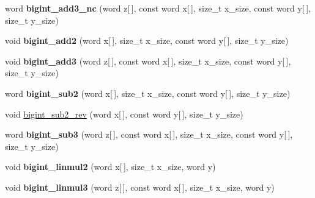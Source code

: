 \begin{DoxyCompactItemize}
\item 
\hypertarget{namespaceBotan_ac6b0c61acfab2f864b2cf3999ca76c01}{word {\bfseries bigint\-\_\-add3\-\_\-nc} (word z\mbox{[}$\,$\mbox{]}, const word x\mbox{[}$\,$\mbox{]}, size\-\_\-t x\-\_\-size, const word y\mbox{[}$\,$\mbox{]}, size\-\_\-t y\-\_\-size)}\label{namespaceBotan_ac6b0c61acfab2f864b2cf3999ca76c01}

\item 
\hypertarget{namespaceBotan_a909ae118a4227e2c3b1d6dac8cde629c}{void {\bfseries bigint\-\_\-add2} (word x\mbox{[}$\,$\mbox{]}, size\-\_\-t x\-\_\-size, const word y\mbox{[}$\,$\mbox{]}, size\-\_\-t y\-\_\-size)}\label{namespaceBotan_a909ae118a4227e2c3b1d6dac8cde629c}

\item 
\hypertarget{namespaceBotan_a2b90c82b13db8553eaa2701a8dd5975f}{void {\bfseries bigint\-\_\-add3} (word z\mbox{[}$\,$\mbox{]}, const word x\mbox{[}$\,$\mbox{]}, size\-\_\-t x\-\_\-size, const word y\mbox{[}$\,$\mbox{]}, size\-\_\-t y\-\_\-size)}\label{namespaceBotan_a2b90c82b13db8553eaa2701a8dd5975f}

\item 
\hypertarget{namespaceBotan_a1d2b962eb5d832116befc5957a6c975e}{word {\bfseries bigint\-\_\-sub2} (word x\mbox{[}$\,$\mbox{]}, size\-\_\-t x\-\_\-size, const word y\mbox{[}$\,$\mbox{]}, size\-\_\-t y\-\_\-size)}\label{namespaceBotan_a1d2b962eb5d832116befc5957a6c975e}

\item 
void \hyperlink{namespaceBotan_a108c3a5b46712583de64a39d5fa6841b}{bigint\-\_\-sub2\-\_\-rev} (word x\mbox{[}$\,$\mbox{]}, const word y\mbox{[}$\,$\mbox{]}, size\-\_\-t y\-\_\-size)
\item 
\hypertarget{namespaceBotan_aecdda04dbd8f4ec5aab85af9983e9c7a}{word {\bfseries bigint\-\_\-sub3} (word z\mbox{[}$\,$\mbox{]}, const word x\mbox{[}$\,$\mbox{]}, size\-\_\-t x\-\_\-size, const word y\mbox{[}$\,$\mbox{]}, size\-\_\-t y\-\_\-size)}\label{namespaceBotan_aecdda04dbd8f4ec5aab85af9983e9c7a}

\item 
\hypertarget{namespaceBotan_adaae60574552cb9732a25e7dc343b31d}{void {\bfseries bigint\-\_\-linmul2} (word x\mbox{[}$\,$\mbox{]}, size\-\_\-t x\-\_\-size, word y)}\label{namespaceBotan_adaae60574552cb9732a25e7dc343b31d}

\item 
\hypertarget{namespaceBotan_a13a0dbb64f0550a99fa972cb7400be41}{void {\bfseries bigint\-\_\-linmul3} (word z\mbox{[}$\,$\mbox{]}, const word x\mbox{[}$\,$\mbox{]}, size\-\_\-t x\-\_\-size, word y)}\label{namespaceBotan_a13a0dbb64f0550a99fa972cb7400be41}


\end{DoxyCompactItemize}
